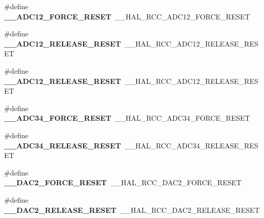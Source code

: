 \begin{DoxyCompactItemize}
\item 
\hypertarget{group___h_a_l___r_c_c___aliased_gacbc2844f7655815ba4ae65f4ca715dbb}{\#define {\bfseries \-\_\-\-\_\-\-A\-D\-C12\-\_\-\-F\-O\-R\-C\-E\-\_\-\-R\-E\-S\-E\-T}~\-\_\-\-\_\-\-H\-A\-L\-\_\-\-R\-C\-C\-\_\-\-A\-D\-C12\-\_\-\-F\-O\-R\-C\-E\-\_\-\-R\-E\-S\-E\-T}\label{group___h_a_l___r_c_c___aliased_gacbc2844f7655815ba4ae65f4ca715dbb}

\item 
\hypertarget{group___h_a_l___r_c_c___aliased_gaccd3e06d5b914cebaaacbc94d05c7660}{\#define {\bfseries \-\_\-\-\_\-\-A\-D\-C12\-\_\-\-R\-E\-L\-E\-A\-S\-E\-\_\-\-R\-E\-S\-E\-T}~\-\_\-\-\_\-\-H\-A\-L\-\_\-\-R\-C\-C\-\_\-\-A\-D\-C12\-\_\-\-R\-E\-L\-E\-A\-S\-E\-\_\-\-R\-E\-S\-E\-T}\label{group___h_a_l___r_c_c___aliased_gaccd3e06d5b914cebaaacbc94d05c7660}

\item 
\hypertarget{group___h_a_l___r_c_c___aliased_gaccd3e06d5b914cebaaacbc94d05c7660}{\#define {\bfseries \-\_\-\-\_\-\-A\-D\-C12\-\_\-\-R\-E\-L\-E\-A\-S\-E\-\_\-\-R\-E\-S\-E\-T}~\-\_\-\-\_\-\-H\-A\-L\-\_\-\-R\-C\-C\-\_\-\-A\-D\-C12\-\_\-\-R\-E\-L\-E\-A\-S\-E\-\_\-\-R\-E\-S\-E\-T}\label{group___h_a_l___r_c_c___aliased_gaccd3e06d5b914cebaaacbc94d05c7660}

\item 
\hypertarget{group___h_a_l___r_c_c___aliased_ga9d32ad39aa9a52a93e5cc48977fac1a1}{\#define {\bfseries \-\_\-\-\_\-\-A\-D\-C34\-\_\-\-F\-O\-R\-C\-E\-\_\-\-R\-E\-S\-E\-T}~\-\_\-\-\_\-\-H\-A\-L\-\_\-\-R\-C\-C\-\_\-\-A\-D\-C34\-\_\-\-F\-O\-R\-C\-E\-\_\-\-R\-E\-S\-E\-T}\label{group___h_a_l___r_c_c___aliased_ga9d32ad39aa9a52a93e5cc48977fac1a1}

\item 
\hypertarget{group___h_a_l___r_c_c___aliased_gad758bcf779fd9cab005fcc8fc6bf23ae}{\#define {\bfseries \-\_\-\-\_\-\-A\-D\-C34\-\_\-\-R\-E\-L\-E\-A\-S\-E\-\_\-\-R\-E\-S\-E\-T}~\-\_\-\-\_\-\-H\-A\-L\-\_\-\-R\-C\-C\-\_\-\-A\-D\-C34\-\_\-\-R\-E\-L\-E\-A\-S\-E\-\_\-\-R\-E\-S\-E\-T}\label{group___h_a_l___r_c_c___aliased_gad758bcf779fd9cab005fcc8fc6bf23ae}

\item 
\hypertarget{group___h_a_l___r_c_c___aliased_gaf8cc5ae83a56884ca8e347a876f425b3}{\#define {\bfseries \-\_\-\-\_\-\-D\-A\-C2\-\_\-\-F\-O\-R\-C\-E\-\_\-\-R\-E\-S\-E\-T}~\-\_\-\-\_\-\-H\-A\-L\-\_\-\-R\-C\-C\-\_\-\-D\-A\-C2\-\_\-\-F\-O\-R\-C\-E\-\_\-\-R\-E\-S\-E\-T}\label{group___h_a_l___r_c_c___aliased_gaf8cc5ae83a56884ca8e347a876f425b3}

\item 
\hypertarget{group___h_a_l___r_c_c___aliased_ga2ca6c2de66e0242e9941d090e8e99ecd}{\#define {\bfseries \-\_\-\-\_\-\-D\-A\-C2\-\_\-\-R\-E\-L\-E\-A\-S\-E\-\_\-\-R\-E\-S\-E\-T}~\-\_\-\-\_\-\-H\-A\-L\-\_\-\-R\-C\-C\-\_\-\-D\-A\-C2\-\_\-\-R\-E\-L\-E\-A\-S\-E\-\_\-\-R\-E\-S\-E\-T}\label{group___h_a_l___r_c_c___aliased_ga2ca6c2de66e0242e9941d090e8e99ecd}


\end{DoxyCompactItemize}
